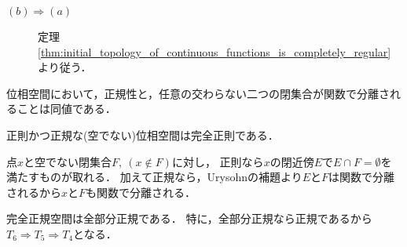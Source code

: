 \begin{prf}
\begin{description}
			\item[$(b) \Longrightarrow (a)$] 
				定理\ref{thm:initial_topology_of_continuous_functions_is_completely_regular}
				より従う．
				\QED
		\end{description}
	\end{prf}
	
	\begin{screen}
		\begin{thm}
		\label{thm:Urysohn_lemma}
			位相空間において，正規性と，任意の交わらない二つの閉集合が関数で分離されることは同値である．
		\end{thm}
	\end{screen}
	
	\begin{screen}
		\begin{thm}[正則かつ正規なら完全正則]
		\label{thm:if_regular_and_normal_then_completely_normal}
			正則かつ正規な(空でない)位相空間は完全正則である．
		\end{thm}
	\end{screen}
	
	\begin{prf}
		点$x$と空でない閉集合$F,\ (x \notin F)$に対し，
		正則なら$x$の閉近傍$E$で$E \cap F = \emptyset$を満たすものが取れる．
		加えて正規なら，Urysohnの補題より$E$と$F$は関数で分離されるから$x$と$F$も関数で分離される．
		\QED
	\end{prf}
	
	\begin{screen}
		\begin{thm}[$T_4 \Longrightarrow T_3$]
		\end{thm}
	\end{screen}
	
	\begin{screen}
		\begin{thm}
			完全正規空間は全部分正規である．
			特に，全部分正規なら正規であるから
			$T_6 \Longrightarrow T_5 \Longrightarrow T_4$となる．
		\end{thm}
	\end{screen}
	
